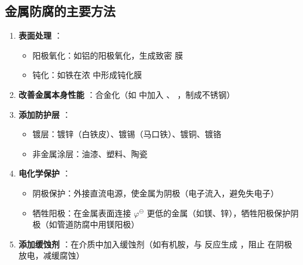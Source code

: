 \subsection{金属防腐的主要方法} 
\begin{enumerate} 
    \item \textbf{表面处理} ：
    \begin{itemize} 
        \item 阳极氧化：如铝的阳极氧化，生成致密  膜
        \item 钝化：如铁在浓  中形成钝化膜
    \end{itemize} 
    
    \item \textbf{改善金属本身性能} ：合金化（如  中加入  、  ，制成不锈钢）
    
    \item \textbf{添加防护层} ：
    \begin{itemize} 
        \item 镀层：镀锌（白铁皮）、镀锡（马口铁）、镀铜、镀铬
        \item 非金属涂层：油漆、塑料、陶瓷
    \end{itemize} 
    
    \item \textbf{电化学保护} ：
    \begin{itemize} 
        \item 阴极保护：外接直流电源，使金属为阴极（电子流入，避免失电子）
        \item 牺牲阳极：在金属表面连接 $ \varphi^\ominus $ 更低的金属（如镁、锌），牺牲阳极保护阴极（如管道防腐中用镁阳极）
    \end{itemize} 
    
    \item \textbf{添加缓蚀剂} ：在介质中加入缓蚀剂（如有机胺，与  反应生成  ，阻止  在阴极放电，减缓腐蚀）
\end{enumerate} 